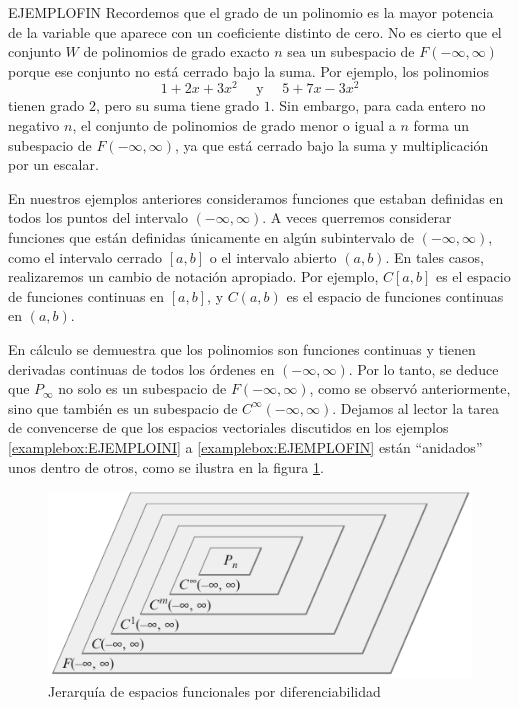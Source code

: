 \begin{examplebox}{}{EJEMPLOFIN}
    Recordemos que el grado de un polinomio es la mayor potencia de la variable que aparece con un coeficiente distinto de cero. No es cierto que el conjunto $W$ de polinomios de grado exacto $n$ sea un subespacio de $F(-\infty, \infty)$ porque ese conjunto no está cerrado bajo la suma. Por ejemplo, los polinomios
    $$1 + 2x + 3x^2 \quad \text{ y } \quad 5 + 7x - 3x^2$$
    tienen grado $2$, pero su suma tiene grado $1$. Sin embargo, para cada entero no negativo $n$, el conjunto de polinomios de grado menor o igual a $n$ forma un subespacio de $F(-\infty, \infty)$, ya que está cerrado bajo la suma y multiplicación por un escalar.
\end{examplebox}

En nuestros ejemplos anteriores consideramos funciones que estaban definidas en todos los puntos del intervalo $(-\infty, \infty)$. A veces querremos considerar funciones que están definidas únicamente en algún subintervalo de $(-\infty, \infty)$, como el intervalo cerrado $[a, b]$ o el intervalo abierto $(a, b)$. En tales casos, realizaremos un cambio de notación apropiado. Por ejemplo, $C[a, b]$ es el espacio de funciones continuas en $[a, b]$, y $C(a, b)$ es el espacio de funciones continuas en $(a, b)$.

En cálculo se demuestra que los polinomios son funciones continuas y tienen derivadas continuas de todos los órdenes en $(-\infty, \infty)$. Por lo tanto, se deduce que $P_\infty$ no solo es un subespacio de $F(-\infty, \infty)$, como se observó anteriormente, sino que también es un subespacio de $C^\infty(-\infty, \infty)$. Dejamos al lector la tarea de convencerse de que los espacios vectoriales discutidos en los ejemplos \ref{examplebox:EJEMPLOINI} a \ref{examplebox:EJEMPLOFIN} están “anidados” unos dentro de otros, como se ilustra en la figura \ref{JAJAIQPAPOAOSOOAKJS}.
\begin{figure}[h!]
    \centering
    \includegraphics[width=\textwidth]{Images/Capitulo1/AnidadosBN.pdf}
    \caption{Jerarquía de espacios funcionales por diferenciabilidad}
    \label{JAJAIQPAPOAOSOOAKJS}
\end{figure}

